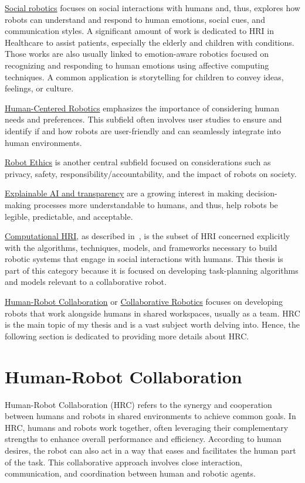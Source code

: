 \uline{Social robotics} focuses on social interactions with humans and, thus, explores how robots can understand and respond to human emotions, social cues, and communication styles.
A significant amount of work is dedicated to HRI in Healthcare to assist patients, especially the elderly and children with conditions. Those works are also usually linked to emotion-aware robotics focused on recognizing and responding to human emotions using affective computing techniques. A common application is storytelling for children to convey ideas, feelings, or culture. 

\uline{Human-Centered Robotics} emphasizes the importance of considering human needs and preferences. This subfield often involves user studies to ensure and identify if and how robots are user-friendly and can seamlessly integrate into human environments.

\uline{Robot Ethics} is another central subfield focused on considerations such as privacy, safety, responsibility/accountability, and the impact of robots on society.

\uline{Explainable AI and transparency} are a growing interest in making decision-making processes more understandable to humans, and thus, help robots be legible, predictable, and acceptable.

\uline{Computational HRI}, as described in~\cite{thomaz_computational_2016}, is the subset of HRI concerned explicitly with the algorithms, techniques, models, and frameworks necessary to build robotic systems that engage in social interactions with humans. This thesis is part of this category because it is focused on developing task-planning algorithms and models relevant to a collaborative robot. 

\uline{Human-Robot Collaboration} or \uline{Collaborative Robotics} focuses on developing robots that work alongside humans in shared workspaces, usually as a team. HRC is the main topic of my thesis and is a vast subject worth delving into. Hence, the following section is dedicated to providing more details about HRC.

\section{Human-Robot Collaboration}

Human-Robot Collaboration (HRC) refers to the synergy and cooperation between humans and robots in shared environments to achieve common goals. In HRC, humans and robots work together, often leveraging their complementary strengths to enhance overall performance and efficiency. According to human desires, the robot can also act in a way that eases and facilitates the human part of the task. This collaborative approach involves close interaction, communication, and coordination between human and robotic agents.


